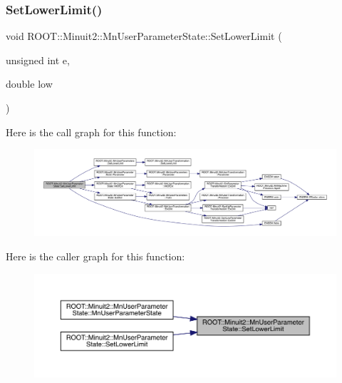 \mbox{\label{classROOT_1_1Minuit2_1_1MnUserParameterState_ae2601510da37a8571b0b22fe0e960b51}} 
\subsubsection{\texorpdfstring{SetLowerLimit()}{SetLowerLimit()}\hspace{0.1cm}{\footnotesize\ttfamily [2/4]}}
{\footnotesize\ttfamily void R\+O\+O\+T\+::\+Minuit2\+::\+Mn\+User\+Parameter\+State\+::\+Set\+Lower\+Limit (\begin{DoxyParamCaption}\item[{unsigned int}]{e,  }\item[{double}]{low }\end{DoxyParamCaption})}

Here is the call graph for this function\+:\nopagebreak
\begin{figure}[H]
\begin{center}
\leavevmode
\includegraphics[width=350pt]{d3/de0/classROOT_1_1Minuit2_1_1MnUserParameterState_ae2601510da37a8571b0b22fe0e960b51_cgraph}
\end{center}
\end{figure}
Here is the caller graph for this function\+:\nopagebreak
\begin{figure}[H]
\begin{center}
\leavevmode
\includegraphics[width=350pt]{d3/de0/classROOT_1_1Minuit2_1_1MnUserParameterState_ae2601510da37a8571b0b22fe0e960b51_icgraph}
\end{center}
\end{figure}
\mbox{\label{classROOT_1_1Minuit2_1_1MnUserParameterState_afc9466eb6db8e8f07309dcd7a760d116}} 
